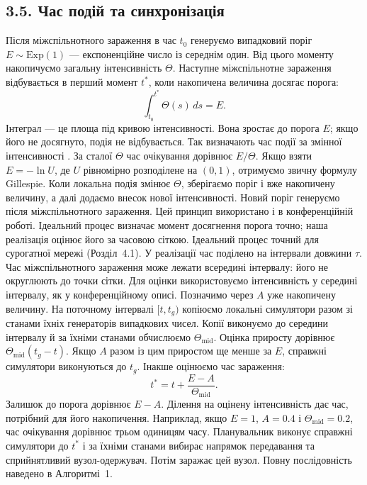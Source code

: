 ﻿\documentclass[11pt,a4paper]{article}
\newcommand{\Exp}{\mathrm{Exp}}
\begin{document}
\subsection*{3.5. Час подій та синхронізація}
Після міжспільнотного зараження в час $t_0$ генеруємо випадковий поріг $E\sim\Exp(1)$ --- експоненційне число із середнім один. Від цього моменту накопичуємо загальну інтенсивність $\Theta$. Наступне міжспільнотне зараження відбувається в перший момент $t^\ast$, коли накопичена величина досягає порога:
\begin{equation*}\int_{t_0}^{t^\ast}\Theta(s)\,ds=E.\tag{5}
\end{equation*}
Інтеграл --- це площа під кривою інтенсивності. Вона зростає до порога $E$; якщо його не досягнуто, подія не відбувається. Так визначають час події за змінної інтенсивності \citep{ethier1986,anderson2007}. За сталої $\Theta$ час очікування дорівнює $E/\Theta$. Якщо взяти $E=-\ln U$, де $U$ рівномірно розподілене на $(0,1)$, отримуємо звичну формулу Gillespie. Коли локальна подія змінює $\Theta$, зберігаємо поріг і вже накопичену величину, а далі додаємо внесок нової інтенсивності. Новий поріг генеруємо після міжспільнотного зараження. Цей принцип використано і в конференційній роботі. Ідеальний процес визначає момент досягнення порога точно; наша реалізація оцінює його за часовою сіткою. Ідеальний процес точний для сурогатної мережі (Розділ~4.1).
У реалізації час поділено на інтервали довжини $\tau$. Час міжспільнотного зараження може лежати всередині інтервалу: його не округлюють до точки сітки. Для оцінки використовуємо інтенсивність у середині інтервалу, як у конференційному описі. Позначимо через $A$ уже накопичену величину. На поточному інтервалі $[t,t_g)$ копіюємо локальні симулятори разом зі станами їхніх генераторів випадкових чисел. Копії виконуємо до середини інтервалу й за їхніми станами обчислюємо $\Theta_{\mathrm{mid}}$. Оцінка приросту дорівнює $\Theta_{\mathrm{mid}}(t_g-t)$. Якщо $A$ разом із цим приростом ще менше за $E$, справжні симулятори виконуються до $t_g$. Інакше оцінюємо час зараження:
\begin{equation*}t^\ast=t+\frac{E-A}{\Theta_{\mathrm{mid}}}.\tag{6}
\end{equation*}
Залишок до порога дорівнює $E-A$. Ділення на оцінену інтенсивність дає час, потрібний для його накопичення. Наприклад, якщо $E=1$, $A=0.4$ і $\Theta_{\mathrm{mid}}=0.2$, час очікування дорівнює трьом одиницям часу. Планувальник виконує справжні симулятори до $t^\ast$ і за їхніми станами вибирає напрямок передавання та сприйнятливий вузол-одержувач. Потім заражає цей вузол. Повну послідовність наведено в Алгоритмі~1.
\end{document}
